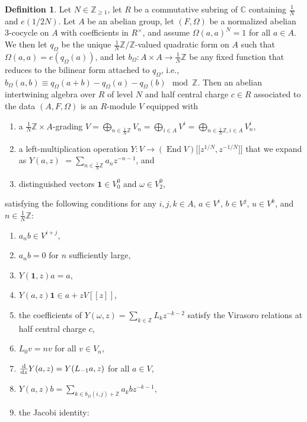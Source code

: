 \documentclass[pdftex]{sigma}
\newcommand{\bC}{\mathbb{C}}
\newcommand{\bZ}{\mathbb{Z}}
\newcommand{\unit}{\mathbf{1}}
\DeclareMathOperator{\End}{End}
\theoremstyle{definition}
\newtheorem{defn}[thm]{Definition}
\begin{document}
\begin{defn}
Let $N \in \bZ_{\geq 1}$, let $R$ be a commutative subring of $\bC$ containing $\frac{1}{N}$ and $e(1/2N)$. Let $A$ be an abelian group, let $(F,\Omega)$ be a normalized abelian 3-cocycle on $A$ with coefficients in $R^\times$, and assume $\Omega(a,a)^N = 1$ for all $a \in A$. We then let $q_\Omega$ be the unique $\frac{1}{N}\bZ/\bZ$-valued quadratic form on $A$ such that $\Omega(a,a) = e(q_\Omega(a))$, and let $b_\Omega\colon A \times A \to \frac{1}{N}\bZ$ be any fixed function that reduces to the bilinear form attached to $q_\Omega$, i.e., $b_\Omega(a,b) \equiv q_\Omega(a+b) - q_\Omega(a) - q_\Omega(b) \mod \bZ$. Then an abelian intertwining algebra over $R$ of level $N$ and half central charge $c \in R$ associated to the data $(A, F, \Omega)$ is an $R$-module $V$ equipped with
\begin{enumerate}\itemsep=0pt
\item[1)] a $\frac{1}{N}\bZ \times A$-grading $V = \bigoplus_{n \in \frac{1}{N} \bZ} V_n = \bigoplus_{i \in A} V^i = \bigoplus_{n \in \frac{1}{N} \bZ, i \in A} V_n^i$,
\item[2)] a left-multiplication operation $Y\colon V \to (\End V)\big[\big[z^{1/N},z^{-1/N}\big]\big]$ that we expand as $Y(a,z)$ $= \sum\limits_{n \in \frac{1}{N}\bZ} a_n z^{-n-1}$, and
\item[3)] distinguished vectors $\unit \in V_0^0$ and $\omega \in V_2^0$,
\end{enumerate}
satisfying the following conditions for any $i,j,k \in A$, $a \in V^i$, $b \in V^j$, $u \in V^k$, and $n \in \frac{1}{N}\bZ$:
\begin{enumerate}\itemsep=0pt
\item[1)] $a_n b \in V^{i+j}$,
\item[2)] $a_n b = 0$ for $n$ sufficiently large,
\item[3)] $Y(\unit, z)a = a$,
\item[4)] $Y(a,z)\unit \in a + zV[[z]]$,
\item[5)] the coefficients of $Y(\omega,z) = \sum\limits_{k \in \bZ} L_k z^{-k-2}$ satisfy the Virasoro relations at half central charge $c$,
\item[6)] $L_0 v = nv$ for all $v \in V_n$,
\item[7)] $\frac{{\rm d}}{{\rm d}z} Y(a,z) = Y(L_{-1}a,z)$ for all $a \in V$,
\item[8)] $Y(a,z)b = \sum\limits_{k \in b_\Omega(i,j) + \bZ} a_k b z^{-k-1}$,
\item[9)] the Jacobi identity:

\end{enumerate}
\end{defn}
\end{document}
